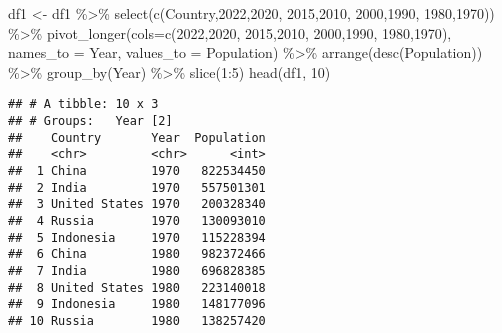 \documentclass[
]{article}
\newenvironment{Shaded}{\begin{snugshade}}{\end{snugshade}}
\newcommand{\AttributeTok}[1]{\textcolor[rgb]{0.77,0.63,0.00}{#1}}
\newcommand{\DecValTok}[1]{\textcolor[rgb]{0.00,0.00,0.81}{#1}}
\newcommand{\FunctionTok}[1]{\textcolor[rgb]{0.00,0.00,0.00}{#1}}
\newcommand{\NormalTok}[1]{#1}
\newcommand{\OtherTok}[1]{\textcolor[rgb]{0.56,0.35,0.01}{#1}}
\newcommand{\SpecialCharTok}[1]{\textcolor[rgb]{0.00,0.00,0.00}{#1}}
\newcommand{\StringTok}[1]{\textcolor[rgb]{0.31,0.60,0.02}{#1}}
\begin{document}
\begin{Shaded}
\begin{Highlighting}[]
\NormalTok{df1 }\OtherTok{\textless{}{-}}\NormalTok{ df1 }\SpecialCharTok{\%\textgreater{}\%} \FunctionTok{select}\NormalTok{(}\FunctionTok{c}\NormalTok{(}\StringTok{\textquotesingle{}Country\textquotesingle{}}\NormalTok{,}\StringTok{\textquotesingle{}2022\textquotesingle{}}\NormalTok{,}\StringTok{\textquotesingle{}2020\textquotesingle{}}\NormalTok{,}
                       \StringTok{\textquotesingle{}2015\textquotesingle{}}\NormalTok{,}\StringTok{\textquotesingle{}2010\textquotesingle{}}\NormalTok{,}
                      \StringTok{\textquotesingle{}2000\textquotesingle{}}\NormalTok{,}\StringTok{\textquotesingle{}1990\textquotesingle{}}\NormalTok{,}
                      \StringTok{\textquotesingle{}1980\textquotesingle{}}\NormalTok{,}\StringTok{\textquotesingle{}1970\textquotesingle{}}\NormalTok{)) }\SpecialCharTok{\%\textgreater{}\%} \FunctionTok{pivot\_longer}\NormalTok{(}\AttributeTok{cols=}\FunctionTok{c}\NormalTok{(}\StringTok{\textquotesingle{}2022\textquotesingle{}}\NormalTok{,}\StringTok{\textquotesingle{}2020\textquotesingle{}}\NormalTok{,}
                       \StringTok{\textquotesingle{}2015\textquotesingle{}}\NormalTok{,}\StringTok{\textquotesingle{}2010\textquotesingle{}}\NormalTok{,}
                      \StringTok{\textquotesingle{}2000\textquotesingle{}}\NormalTok{,}\StringTok{\textquotesingle{}1990\textquotesingle{}}\NormalTok{,}
                      \StringTok{\textquotesingle{}1980\textquotesingle{}}\NormalTok{,}\StringTok{\textquotesingle{}1970\textquotesingle{}}\NormalTok{),}
                      \AttributeTok{names\_to =} \StringTok{\textquotesingle{}Year\textquotesingle{}}\NormalTok{, }\AttributeTok{values\_to =} \StringTok{\textquotesingle{}Population\textquotesingle{}}\NormalTok{) }\SpecialCharTok{\%\textgreater{}\%}
  \FunctionTok{arrange}\NormalTok{(}\FunctionTok{desc}\NormalTok{(Population)) }\SpecialCharTok{\%\textgreater{}\%}
  \FunctionTok{group\_by}\NormalTok{(Year) }\SpecialCharTok{\%\textgreater{}\%}
  \FunctionTok{slice}\NormalTok{(}\DecValTok{1}\SpecialCharTok{:}\DecValTok{5}\NormalTok{)}
\FunctionTok{head}\NormalTok{(df1, }\DecValTok{10}\NormalTok{)}
\end{Highlighting}
\end{Shaded}

\begin{verbatim}
## # A tibble: 10 x 3
## # Groups:   Year [2]
##    Country       Year  Population
##    <chr>         <chr>      <int>
##  1 China         1970   822534450
##  2 India         1970   557501301
##  3 United States 1970   200328340
##  4 Russia        1970   130093010
##  5 Indonesia     1970   115228394
##  6 China         1980   982372466
##  7 India         1980   696828385
##  8 United States 1980   223140018
##  9 Indonesia     1980   148177096
## 10 Russia        1980   138257420
\end{verbatim}
\end{document}
